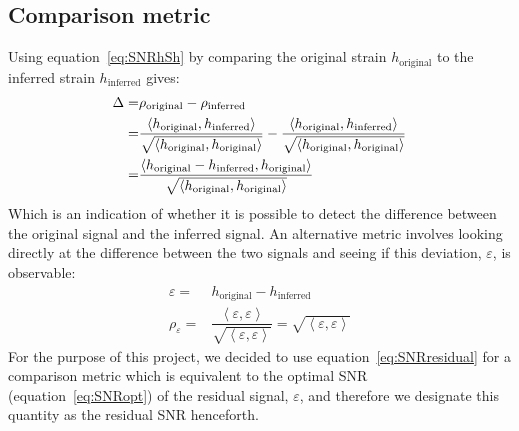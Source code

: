 \subsection{Comparison metric}
\label{sec:SNRresidual}
Using equation~\ref{eq:SNRhSh} by comparing the original strain $h_{\mathrm{original}}$ to the inferred strain $h_{\mathrm{inferred}}$ gives:
\begin{align}
	\Delta = & \rho_{\mathrm{original}} - \rho_{\mathrm{inferred}}\notag\\
	 = & \dfrac{\left<h_{\mathrm{original}},h_{\mathrm{inferred}}\right>}{\sqrt{\left<h_{\mathrm{original}},h_{\mathrm{original}}\right>}}
	 -\dfrac{\left<h_{\mathrm{original}},h_{\mathrm{inferred}}\right>}{\sqrt{\left<h_{\mathrm{original}},h_{\mathrm{original}}\right>}}\notag\\
	= & \dfrac{\left<h_{\mathrm{original}}-h_{\mathrm{inferred}},h_{\mathrm{original}}\right>}
			{\sqrt{\left<h_{\mathrm{original}},h_{\mathrm{original}}\right>}}\label{eq:DeltaResidual}
\end{align}
Which is an indication of whether it is possible to detect the difference between the original signal and the inferred signal. An alternative metric involves looking directly at the difference between the two signals and seeing if this deviation, $\varepsilon$, is observable:
\begin{align}
\varepsilon=&h_{\mathrm{original}}- h_{\mathrm{inferred}}\\
\rho_\varepsilon = & \dfrac{\left<\varepsilon,\varepsilon\right>}{\sqrt{\left<\varepsilon,\varepsilon\right>}}
				=\sqrt{\left<\varepsilon,\varepsilon\right>}\label{eq:SNRresidual}
\end{align}
For the purpose of this project, we decided to use equation~\ref{eq:SNRresidual} for a comparison metric which is equivalent to the optimal SNR (equation~\ref{eq:SNRopt}) of the residual signal, $\varepsilon$, and therefore we designate this quantity as the residual SNR henceforth.
